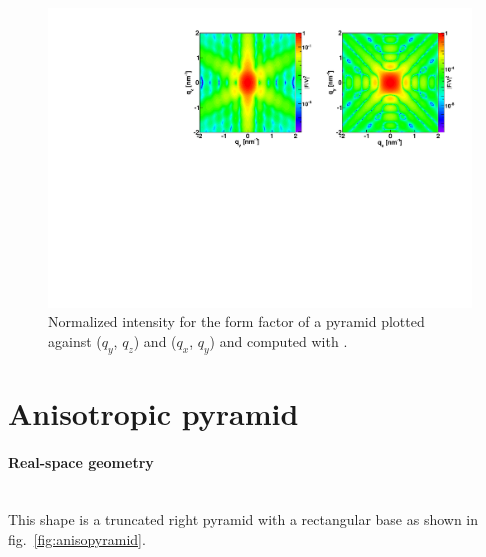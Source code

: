 \begin{figure}[ht]
\begin{center}
\includegraphics[angle=-90,width=\textwidth]{Figures/ff/figffpyramid.pdf}
\end{center}
\caption{Normalized intensity for the form factor of a
  pyramid plotted against ($q_y$, $q_z$) and  
  ($q_x$, $q_y$) and computed with  .}
\label{fig:FFPyramidEx}
\end{figure}


\newpage
\section{Anisotropic pyramid}  

\paragraph{Real-space geometry}\mbox{}\\
This shape is a truncated right pyramid with a rectangular base as
shown in fig.~\ref{fig:anisopyramid}.

